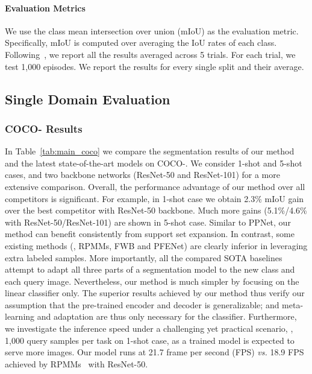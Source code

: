 \documentclass[10pt,twocolumn,letterpaper]{article}
\begin{document}
\paragraph{Evaluation Metrics}
We use the class mean intersection over union (mIoU) as the evaluation metric. 
Specifically, mIoU is computed over averaging the IoU rates of each class. Following~\cite{liu2020part}, we report all the results averaged across 5 trials. For each trial, we test 1,000 episodes. 
We report the results for every single split and their average.



\subsection{Single Domain Evaluation}

\subsubsection{COCO- Results}

In Table~\ref{tab:main_coco} we compare the segmentation results of our method and the latest state-of-the-art models on COCO-.
We consider 1-shot and 5-shot cases, and two backbone networks (ResNet-50 and ResNet-101) for a more extensive comparison. 
Overall, the performance advantage of our method over all competitors
is significant.
For example, in 1-shot case we obtain 2.3\% mIoU gain over the best competitor with ResNet-50 backbone.
Much more gains (5.1\%/4.6\% with ResNet-50/ResNet-101) are shown in 5-shot case.
Similar to PPNet, our method can benefit consistently
from support set expansion.
In contrast, some existing methods (\eg, RPMMs, FWB and PFENet) are 
clearly inferior in leveraging extra labeled samples.
More importantly, all the compared SOTA baselines attempt to adapt all three parts of a segmentation model to the new class and each query image. Nevertheless, our method is much simpler by focusing on the linear classifier only. The superior results achieved by our method thus verify our assumption that the pre-trained encoder and decoder is generalizable; and meta-learning and adaptation are thus only necessary for the classifier.
Furthermore, we investigate the inference speed under a challenging yet practical scenario, \ie, 1,000 query samples per task on 1-shot case, as a trained model is expected to serve more images.
Our model runs at 21.7 frame per second (FPS) \textit{vs.} 18.9 FPS achieved by RPMMs~\cite{yang2020prototype} with ResNet-50.
\end{document}
